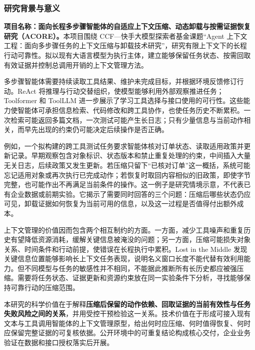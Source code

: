 \justifying
\NSFCBodyText

\subsubsection{研究背景与意义}
\textbf{项目名称：面向长程多步骤智能体的自适应上下文压缩、动态卸载与按需证据恢复研究（ACORE）。}本项目围绕 CCF—快手大模型探索者基金课题“Agent 上下文工程：面向多步骤任务的上下文压缩与卸载技术研究”，研究有限上下文下的长程行动可靠性。拟以现有大语言模型为执行主体，建立能够保留任务状态、按需回取有效证据并控制总调用开销的上下文管理方法。

多步骤智能体需要持续读取工具结果、维护未完成目标，并根据环境反馈修订行动。ReAct 将推理与行动交替组织，使模型能够利用外部观察推进任务\cite{react}；Toolformer 和 ToolLLM 进一步展示了学习工具选择与接口使用的可行性\cite{toolformer,toolbench}。这些能力使智能体可承担信息检索、代码修改和跨工具协作，也使任务历史不断累积。一次检索可能返回多篇文档，一次测试可能产生长日志；只有少量信息与当前动作相关，而早先出现的约束仍可能决定后续操作是否正确。

例如，一个拟构建的跨工具测试任务要求智能体核对订单状态、读取适用政策并更新记录。早期观察包含对象标识、状态版本和禁止重复处理的约束，中间插入大量无关日志，后续政策又发生更新。若压缩只留下“已核对订单”这一概括，系统可能忘记适用对象或再次执行已完成动作；若恢复时取回内容相似的旧政策，即使字节完整，也可能作出不再满足当前条件的操作。这一例子是研究情境示意，不代表已有企业数据或前期实验。它揭示了需要同时回答的三个问题：压缩后哪些状态仍应可见，卸载证据如何恢复为当前可用的信息，以及这一过程是否值得付出额外成本。

上下文管理的价值因而包含两个相互制约的方面。一方面，减少工具噪声和重复历史有望降低资源消耗，缓解关键信息被淹没的问题；另一方面，压缩可能损失对象关系、时间条件和行动前提，使错误在长程执行中累积。Lost in the Middle 发现关键信息位置能够影响长上下文任务表现\cite{lostmiddle}，说明名义窗口长度不能代替有效利用能力。但不同模型与任务的敏感性并不相同，不能据此推断所有长历史都应被强压缩。需要将任务状态、证据更新和资源约束放在同一实验条件下分析，寻找能够保持可靠行动的压缩范围。

本研究的科学价值在于解释\textbf{压缩后保留的动作依赖、回取证据的当前有效性与任务失败风险之间的关系}，并用受控干预检验这一关系。技术价值在于形成可接入现有文本与工具调用智能体的上下文管理原型，给出何时应压缩、何时值得恢复、何时应保留完整证据的可复核依据。公开环境中的可重复结论构成核心交付，企业业务验证在数据和接口授权落实后开展。

